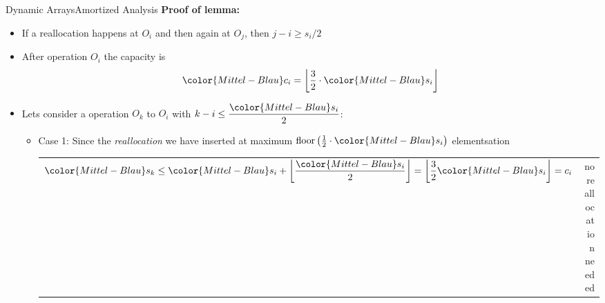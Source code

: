 \begin{frame}{Dynamic Arrays}{Amortized Analysis}
  \textbf{Proof of lemma:}
  \begin{itemize}
  \item
    If a reallocation happens at {\color{Mittel-Blau}$O_i$} and then again at {\color{Mittel-Blau}$O_j$}, then {\color{Mittel-Blau}$j - i\geq s_i/2$}
    \item
      After operation {\color{Mittel-Blau}$O_i$} the capacity is
      \[
        {\color{Mittel-Blau}c_i}
        = \left\lfloor\frac{3}{2}\cdot{\color{Mittel-Blau}s_i}\right\rfloor
      \]
    \item
      Lets consider a operation {\color{Mittel-Blau}$O_k$} to {\color{Mittel-Blau}$O_i$} with
      $k -i \leq \dfrac{\color{Mittel-Blau}s_i}{2}$:
      \begin{itemize}
        \item
          Case 1: Since the \textit{reallocation} we have inserted at
          maximum
          $\mathrm{floor}\left(
            \frac{1}{2} \cdot {\color{Mittel-Blau}s_i}
          \right)$ elementsation
          \vspace{0.5em}\\
          \begin{tabularx}{\linewidth}{Xr}
            ${\color{Mittel-Blau}s_k}
              \leq {\color{Mittel-Blau}s_i} +
                \left\lfloor
                  \dfrac{\color{Mittel-Blau}s_i}{2}
                  \vphantom{\dfrac{3}{2}}
                \right\rfloor
              = \left\lfloor\dfrac{3}{2} {\color{Mittel-Blau}s_i}\right\rfloor
              = c_i$ &
              {\color{Mittel-Blau}no reallocation needed}
          \end{tabularx}
      \end{itemize}
  \end{itemize}
\end{frame}


